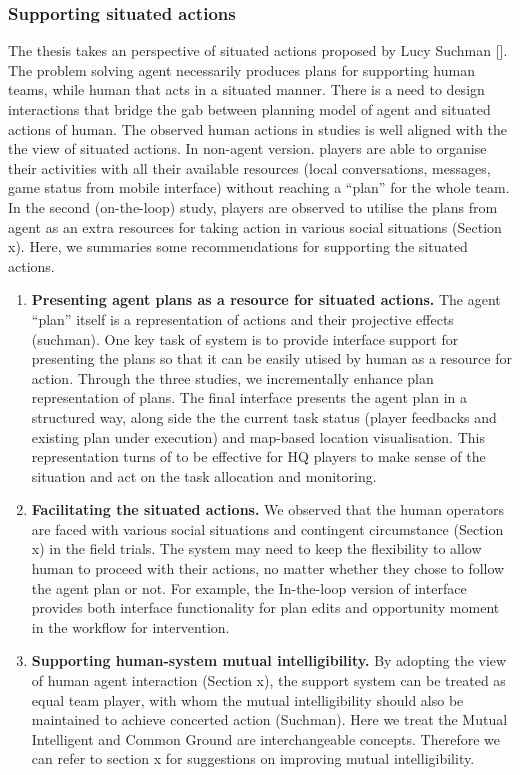 \subsubsection{Supporting situated actions}\label{sec:conclusionSituatedAction}
The thesis takes an perspective of situated actions proposed by Lucy Suchman []. The problem solving agent necessarily produces plans for supporting human teams, while human that acts in a situated manner. There is a need to design interactions that bridge the gab between planning model of agent and situated actions of human. The observed human actions in studies is well aligned with the the view of situated actions. In non-agent version. players are able to organise their activities with all their available resources (local conversations, messages, game status from mobile interface) without reaching a ``plan'' for the whole team.  In the second (on-the-loop) study, players are observed to utilise the plans from agent as an extra resources for taking action in various social situations (Section x). Here, we summaries some recommendations for supporting the situated actions. \\

\begin{enumerate}
\item \textbf{Presenting agent plans as a resource for situated actions.} The agent ``plan'' itself is a representation of actions and their projective effects (suchman). One key task of system is to provide interface support for presenting the plans so that it can be easily utised by human as a resource for action. Through the three studies, we incrementally enhance plan representation of plans. The final interface presents the agent plan in a structured way,  along side the the current task status (player feedbacks and existing plan under execution) and map-based location visualisation. This representation turns of to be effective for HQ players to make sense of the situation and act on the task allocation and monitoring.\\

\item \textbf{Facilitating the situated actions.} We observed that the human operators are faced with various social situations and contingent circumstance (Section x) in the field trials. The system may need to keep the flexibility to allow human to proceed with their actions, no matter whether they chose to follow the agent plan or not.  For example, the In-the-loop version of interface provides both interface functionality for plan edits and opportunity moment in the workflow for intervention.  \\

\item \textbf{Supporting human-system mutual intelligibility.} By adopting the view of human agent interaction (Section x), the support system can be treated as equal team player, with whom the mutual intelligibility should also be maintained to achieve concerted action (Suchman). Here we treat the Mutual Intelligent and Common Ground are interchangeable concepts.  Therefore we can refer to section x for suggestions on improving mutual intelligibility. \\
\end{enumerate}

